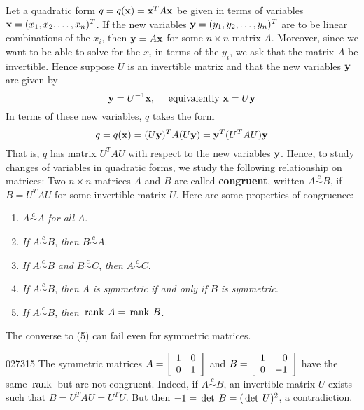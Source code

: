 Let a quadratic form $q = q(\textbf{x}) = \textbf{x}^{T}A\textbf{x}$ be given in terms of variables $\textbf{x} = (x_{1}, x_{2}, \dots, x_{n})^{T}$. If the new variables $\textbf{y} = (y_{1}, y_{2}, \dots, y_{n})^{T}$ are to be linear combinations of the $x_{i}$, then $\textbf{y} = A\textbf{x}$ for some $n \times n$ matrix $A$. Moreover, since we want to be able to solve for the $x_{i}$ in terms of the $y_{i}$, we ask that the matrix $A$ be invertible. Hence suppose $U$ is an invertible matrix and that the new variables $\textbf{y}$ are given by
\begin{equation*}
\textbf{y} = U^{-1}\textbf{x}, \quad \mbox{ equivalently } \textbf{x} = U\textbf{y}
\end{equation*}
In terms of these new variables, $q$ takes the form
\begin{equation*}
q = q(\textbf{x}) = (U\textbf{y})^TA(U\textbf{y}) = \textbf{y}^T(U^TAU)\textbf{y}
\end{equation*}
That is, $q$ has matrix $U^{T}AU$ with respect to the new variables $\textbf{y}$. Hence, to study changes of variables in quadratic forms, we study the following relationship on matrices: Two $n \times n$ matrices $A$ and $B$ are called \textbf{congruent}, written $A \stackrel{c}{\sim} B$, if $B = U^{T}AU$ for some invertible matrix $U$. Here are some properties of congruence:
\begin{enumerate}
	\item $A \stackrel{c}{\sim} A$ \textit{for all} $A$.
	
	\item \textit{If} $A \stackrel{c}{\sim} B$, \textit{then} $B \stackrel{c}{\sim} A$.
	
	\item \textit{If} $A \stackrel{c}{\sim} B$ \textit{and} $B \stackrel{c}{\sim} C$, \textit{then} $A \stackrel{c}{\sim} C$.
	
	\item \textit{If} $A \stackrel{c}{\sim} B$, \textit{then} $A$ \textit{is symmetric if and only if} $B$ \textit{is symmetric}.
	
	\item \textit{If} $A \stackrel{c}{\sim} B$, \textit{then} $\thinspace\operatorname{rank\medspace}A = \thinspace\operatorname{rank\medspace}B$.
\end{enumerate}

\noindent The converse to (5) can fail even for symmetric matrices.


\begin{example}{}{027315}
The symmetric matrices $A = \left[ \begin{array}{rr}
1 & 0 \\
0 & 1
\end{array}\right]$
and $B = \left[ \begin{array}{rr}
1 & 0 \\
0 & -1
\end{array}\right]$
 have the same $\thinspace\operatorname{rank\medspace}$ but are not congruent. Indeed, if $A \stackrel{c}{\sim} B$, an invertible matrix $U$ exists such that $B= U^{T}AU = U^{T}U$. But then $-1 = \thinspace\operatorname{det \medspace}B = (\thinspace\operatorname{det \medspace}U)^{2}$, a contradiction.
\end{example}


